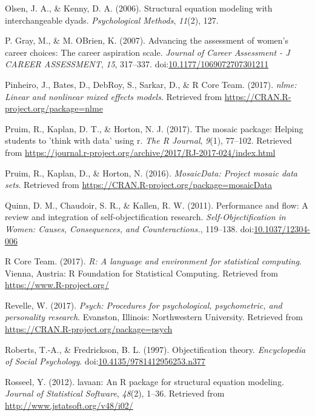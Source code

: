 \documentclass[man]{apa6}
\begin{document}
\hypertarget{ref-olsen2006structural}{}
Olsen, J. A., \& Kenny, D. A. (2006). Structural equation modeling with
interchangeable dyads. \emph{Psychological Methods}, \emph{11}(2), 127.

\hypertarget{ref-grayobrien2007}{}
P. Gray, M., \& M. OBrien, K. (2007). Advancing the assessment of
women's career choices: The career aspiration scale. \emph{Journal of
Career Assessment - J CAREER ASSESSMENT}, \emph{15}, 317--337.
doi:\href{https://doi.org/10.1177/1069072707301211}{10.1177/1069072707301211}

\hypertarget{ref-R-nlme}{}
Pinheiro, J., Bates, D., DebRoy, S., Sarkar, D., \& R Core Team. (2017).
\emph{nlme: Linear and nonlinear mixed effects models}. Retrieved from
\url{https://CRAN.R-project.org/package=nlme}

\hypertarget{ref-R-mosaic}{}
Pruim, R., Kaplan, D. T., \& Horton, N. J. (2017). The mosaic package:
Helping students to 'think with data' using r. \emph{The R Journal},
\emph{9}(1), 77--102. Retrieved from
\url{https://journal.r-project.org/archive/2017/RJ-2017-024/index.html}

\hypertarget{ref-R-mosaicData}{}
Pruim, R., Kaplan, D., \& Horton, N. (2016). \emph{MosaicData: Project
mosaic data sets}. Retrieved from
\url{https://CRAN.R-project.org/package=mosaicData}

\hypertarget{ref-quinnetal}{}
Quinn, D. M., Chaudoir, S. R., \& Kallen, R. W. (2011). Performance and
flow: A review and integration of self-objectification research.
\emph{Self-Objectification in Women: Causes, Consequences, and
Counteractions.}, 119--138.
doi:\href{https://doi.org/10.1037/12304-006}{10.1037/12304-006}

\hypertarget{ref-R-base}{}
R Core Team. (2017). \emph{R: A language and environment for statistical
computing}. Vienna, Austria: R Foundation for Statistical Computing.
Retrieved from \url{https://www.R-project.org/}

\hypertarget{ref-R-psych}{}
Revelle, W. (2017). \emph{Psych: Procedures for psychological,
psychometric, and personality research}. Evanston, Illinois:
Northwestern University. Retrieved from
\url{https://CRAN.R-project.org/package=psych}

\hypertarget{ref-robertsfredrickson}{}
Roberts, T.-A., \& Fredrickson, B. L. (1997). Objectification theory.
\emph{Encyclopedia of Social Psychology}.
doi:\href{https://doi.org/10.4135/9781412956253.n377}{10.4135/9781412956253.n377}

\hypertarget{ref-R-lavaan}{}
Rosseel, Y. (2012). lavaan: An R package for structural equation
modeling. \emph{Journal of Statistical Software}, \emph{48}(2), 1--36.
Retrieved from \url{http://www.jstatsoft.org/v48/i02/}
\end{document}
